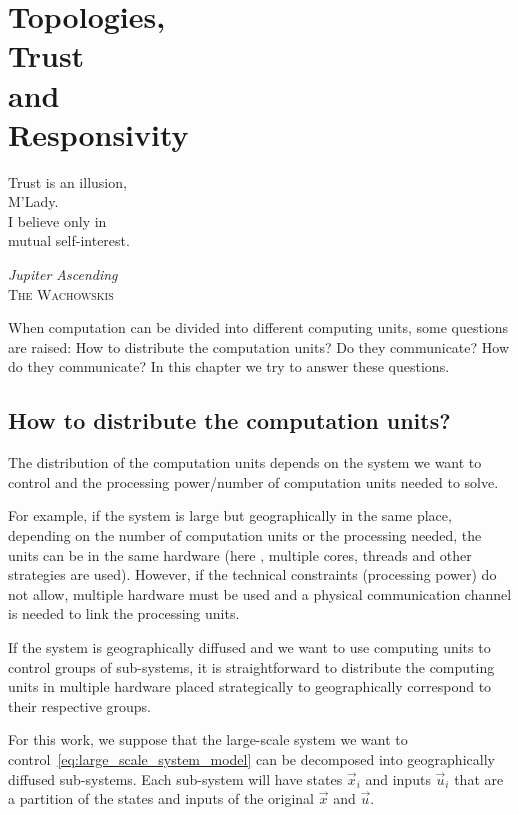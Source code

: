\documentclass[../main.tex]{subfiles}
\begin{document}
\chapter[Topologies, Trust and Responsivity]{Topologies,\\ Trust\\ and \\Responsivity}\label{sec:topoly_trust}
\epigraph{\centering Trust is an illusion, \\M'Lady. \\I believe only in \\mutual self-interest.}
{\textit{Jupiter Ascending}\\\textsc{The Wachowskis}}


When computation can be divided into different computing units, some questions are raised: How to distribute the computation units? Do they communicate? How do they communicate? In this chapter we try to answer these questions.

\minitoc

\section{How to distribute the computation units?}

The distribution of the computation units depends on the system we want to control and the processing power/number of computation units needed to solve.

For example, if the system is large but geographically in the same place, depending on the number of computation units or the processing needed, the units can be in the same hardware (here \GPU, multiple cores, threads and other strategies are used).
However, if the technical constraints (processing power) do not allow, multiple hardware must be used and a physical communication channel is needed to link the processing units.

If the system is geographically diffused and we want to use computing units to control groups of sub-systems, it is straightforward to distribute the computing units in multiple hardware placed strategically to geographically correspond to their respective groups.

For this work, we suppose that the large-scale system we want to control~\eqref{eq:large_scale_system_model} can be decomposed into geographically diffused sub-systems.
Each sub-system will have states $\vec{x}_{i}$ and inputs $\vec{u}_{i}$ that are a partition of the states and inputs of the original $\vec{x}$ and $\vec{u}$.
\end{document}
